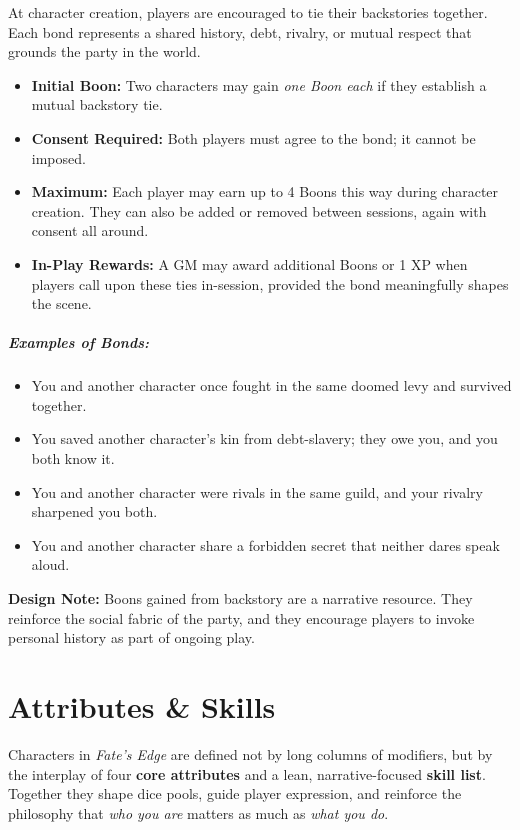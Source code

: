 \documentclass[12pt]{book}
\begin{document}
At character creation, players are encouraged to tie their backstories together.  
Each bond represents a shared history, debt, rivalry, or mutual respect that grounds the party in the world.  

\begin{itemize}
  \item \textbf{Initial Boon:} Two characters may gain \emph{one Boon each} if they establish a mutual backstory tie.  
  \item \textbf{Consent Required:} Both players must agree to the bond; it cannot be imposed.  
  \item \textbf{Maximum:} Each player may earn up to 4 Boons this way during character creation. They can also be added or removed between sessions, again with consent all around. 
  \item \textbf{In-Play Rewards:} A GM may award additional Boons or 1 XP when players call upon these ties in-session, provided the bond meaningfully shapes the scene.  
\end{itemize}

\paragraph{Examples of Bonds:}
\begin{itemize}
  \item You and another character once fought in the same doomed levy and survived together.  
  \item You saved another character’s kin from debt-slavery; they owe you, and you both know it.  
  \item You and another character were rivals in the same guild, and your rivalry sharpened you both.  
  \item You and another character share a forbidden secret that neither dares speak aloud.  
\end{itemize}

\noindent
\textbf{Design Note:} Boons gained from backstory are a narrative resource.  
They reinforce the social fabric of the party, and they encourage players to invoke personal history as part of ongoing play.

\chapter{Attributes \& Skills}

Characters in \textit{Fate’s Edge} are defined not by long columns of modifiers, but by the interplay of four \textbf{core attributes} and a lean, narrative-focused \textbf{skill list}. Together they shape dice pools, guide player expression, and reinforce the philosophy that \emph{who you are} matters as much as \emph{what you do}.
\end{document}
